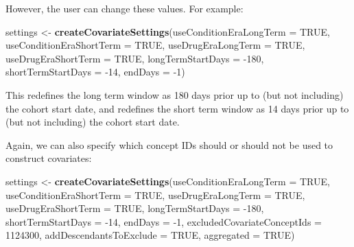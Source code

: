 \documentclass[11pt]{book}
\newenvironment{Shaded}{\begin{snugshade}}{\end{snugshade}}
\newcommand{\DataTypeTok}[1]{\textcolor[rgb]{0.13,0.29,0.53}{#1}}
\newcommand{\DecValTok}[1]{\textcolor[rgb]{0.00,0.00,0.81}{#1}}
\newcommand{\KeywordTok}[1]{\textcolor[rgb]{0.13,0.29,0.53}{\textbf{#1}}}
\newcommand{\NormalTok}[1]{#1}
\newcommand{\OtherTok}[1]{\textcolor[rgb]{0.56,0.35,0.01}{#1}}
\newcommand{\StringTok}[1]{\textcolor[rgb]{0.31,0.60,0.02}{#1}}
\theoremstyle{definition}
\theoremstyle{definition}
\theoremstyle{definition}
\theoremstyle{remark}
\begin{document}
However, the user can change these values. For example:

\begin{Shaded}
\begin{Highlighting}[]
\NormalTok{settings <-}\StringTok{ }\KeywordTok{createCovariateSettings}\NormalTok{(}\DataTypeTok{useConditionEraLongTerm =} \OtherTok{TRUE}\NormalTok{, }
                                    \DataTypeTok{useConditionEraShortTerm =} \OtherTok{TRUE}\NormalTok{, }
                                    \DataTypeTok{useDrugEraLongTerm =} \OtherTok{TRUE}\NormalTok{,}
                                    \DataTypeTok{useDrugEraShortTerm =} \OtherTok{TRUE}\NormalTok{, }
                                    \DataTypeTok{longTermStartDays =} \DecValTok{-180}\NormalTok{, }
                                    \DataTypeTok{shortTermStartDays =} \DecValTok{-14}\NormalTok{, }
                                    \DataTypeTok{endDays =} \DecValTok{-1}\NormalTok{) }
\end{Highlighting}
\end{Shaded}

This redefines the long term window as 180 days prior up to (but not including) the cohort start date, and redefines the short term window as 14 days prior up to (but not including) the cohort start date.

Again, we can also specify which concept IDs should or should not be used to construct covariates:

\begin{Shaded}
\begin{Highlighting}[]
\NormalTok{settings <-}\StringTok{ }\KeywordTok{createCovariateSettings}\NormalTok{(}\DataTypeTok{useConditionEraLongTerm =} \OtherTok{TRUE}\NormalTok{, }
                                    \DataTypeTok{useConditionEraShortTerm =} \OtherTok{TRUE}\NormalTok{, }
                                    \DataTypeTok{useDrugEraLongTerm =} \OtherTok{TRUE}\NormalTok{, }
                                    \DataTypeTok{useDrugEraShortTerm =} \OtherTok{TRUE}\NormalTok{, }
                                    \DataTypeTok{longTermStartDays =} \DecValTok{-180}\NormalTok{, }
                                    \DataTypeTok{shortTermStartDays =} \DecValTok{-14}\NormalTok{, }
                                    \DataTypeTok{endDays =} \DecValTok{-1}\NormalTok{, }
                                    \DataTypeTok{excludedCovariateConceptIds =} \DecValTok{1124300}\NormalTok{, }
                                    \DataTypeTok{addDescendantsToExclude =} \OtherTok{TRUE}\NormalTok{, }
                                    \DataTypeTok{aggregated =} \OtherTok{TRUE}\NormalTok{) }
\end{Highlighting}
\end{Shaded}
\end{document}
